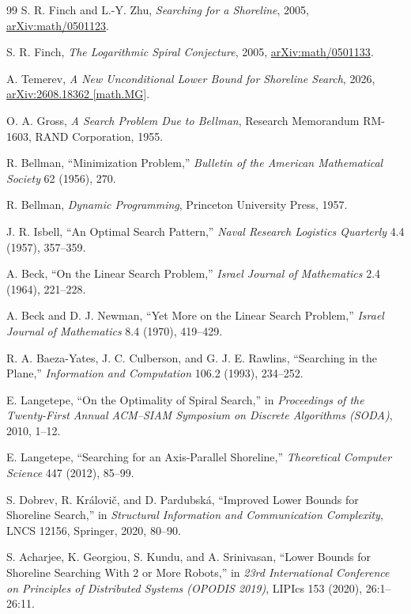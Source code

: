 \documentclass[10pt,a4paper]{article}
\theoremstyle{definition}
\theoremstyle{remark}
\begin{document}
\begin{thebibliography}{99}
S. R. Finch and L.-Y. Zhu,
\emph{Searching for a Shoreline}, 2005,
\href{https://arxiv.org/abs/math/0501123}{arXiv:math/0501123}.

S. R. Finch,
\emph{The Logarithmic Spiral Conjecture}, 2005,
\href{https://arxiv.org/abs/math/0501133}{arXiv:math/0501133}.

A. Temerev,
\emph{A New Unconditional Lower Bound for Shoreline Search}, 2026,
\href{https://arxiv.org/abs/2608.18362}{arXiv:2608.18362 [math.MG]}.

O. A. Gross,
\emph{A Search Problem Due to Bellman},
Research Memorandum RM-1603, RAND Corporation, 1955.

R. Bellman,
``Minimization Problem,''
\emph{Bulletin of the American Mathematical Society} 62 (1956), 270.

R. Bellman,
\emph{Dynamic Programming}, Princeton University Press, 1957.

J. R. Isbell,
``An Optimal Search Pattern,''
\emph{Naval Research Logistics Quarterly} 4.4 (1957), 357--359.

A. Beck,
``On the Linear Search Problem,''
\emph{Israel Journal of Mathematics} 2.4 (1964), 221--228.

A. Beck and D. J. Newman,
``Yet More on the Linear Search Problem,''
\emph{Israel Journal of Mathematics} 8.4 (1970), 419--429.

R. A. Baeza-Yates, J. C. Culberson, and G. J. E. Rawlins,
``Searching in the Plane,''
\emph{Information and Computation} 106.2 (1993), 234--252.

E. Langetepe,
``On the Optimality of Spiral Search,''
in \emph{Proceedings of the Twenty-First Annual ACM--SIAM Symposium on Discrete Algorithms (SODA)}, 2010, 1--12.

E. Langetepe,
``Searching for an Axis-Parallel Shoreline,''
\emph{Theoretical Computer Science} 447 (2012), 85--99.

S. Dobrev, R. Kr\'alovi\v{c}, and D. Pardubsk\'a,
``Improved Lower Bounds for Shoreline Search,''
in \emph{Structural Information and Communication Complexity},
LNCS 12156, Springer, 2020, 80--90.

S. Acharjee, K. Georgiou, S. Kundu, and A. Srinivasan,
``Lower Bounds for Shoreline Searching With 2 or More Robots,''
in \emph{23rd International Conference on Principles of Distributed Systems (OPODIS 2019)},
LIPIcs 153 (2020), 26:1--26:11.


\end{thebibliography}
\end{document}
